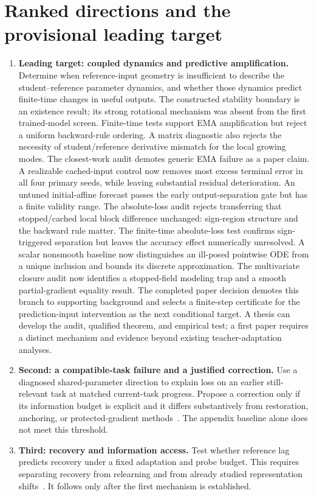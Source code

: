 \documentclass[11pt,a4paper]{article}
\begin{document}
\section{Ranked directions and the provisional leading target}
\begin{enumerate}[leftmargin=*]
\item \textbf{Leading target: coupled dynamics and predictive amplification.}
Determine when reference-input geometry is insufficient to describe the
student--reference parameter dynamics, and whether those dynamics predict
finite-time changes in useful outputs. The constructed stability boundary
is an existence result; its strong rotational mechanism was absent from
the first trained-model screen. Finite-time tests support EMA amplification
but reject a uniform backward-rule ordering. A matrix diagnostic also
rejects the necessity of student/reference derivative mismatch for the
local growing modes. The closest-work audit demotes generic EMA failure
as a paper claim. A realizable cached-input control now removes most
excess terminal error in all four primary seeds, while leaving substantial
residual deterioration. An untuned initial-affine forecast passes the
early output-separation gate but has a finite validity range. The
absolute-loss audit rejects transferring that stopped/cached local block
difference unchanged: sign-region structure and the backward rule matter.
The finite-time absolute-loss test confirms sign-triggered separation
but leaves the accuracy effect numerically unresolved. A scalar
nonsmooth baseline now distinguishes an ill-posed pointwise ODE from a
unique inclusion and bounds its discrete approximation. The multivariate
closure audit now identifies a stopped-field modeling trap and a smooth
partial-gradient equality result. The completed paper decision demotes
this branch to supporting background and selects a finite-step certificate
for the prediction-input intervention as the next conditional target. A thesis can develop the audit, qualified theorem, and empirical
test; a first paper requires a distinct mechanism and evidence beyond
existing teacher-adaptation analyses.
\item \textbf{Second: a compatible-task failure and a justified correction.}
Use a diagnosed shared-parameter direction to explain loss on an earlier
still-relevant task at matched current-task progress. Propose a correction
only if its information budget is explicit and it differs substantively
from restoration, anchoring, or protected-gradient methods~\cite{ogd}.
The appendix baseline alone does not meet this threshold.
\item \textbf{Third: recovery and information access.}
Test whether reference lag predicts recovery under a fixed adaptation and
probe budget. This requires separating recovery from relearning and from
already studied representation shifts~\cite{spurious}. It follows only
after the first mechanism is established.
\end{enumerate}
\end{document}
